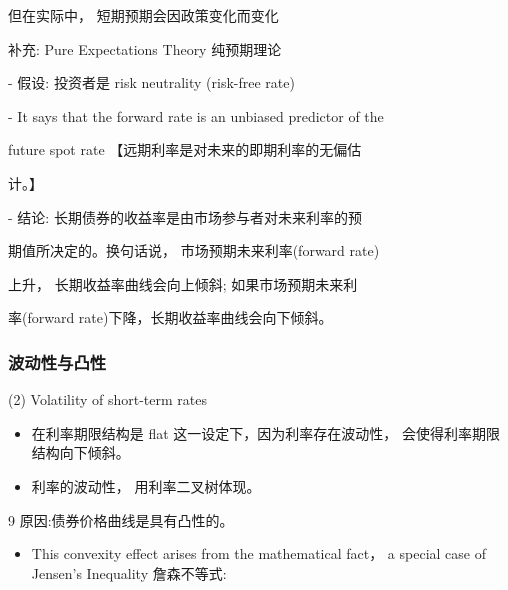但在实际中， 短期预期会因政策变化而变化


补充: Pure Expectations Theory 纯预期理论

\hspace*{1em} - 假设: 投资者是 risk neutrality (risk-free rate)

\hspace*{1em} - It says that the forward rate is an unbiased predictor of the

\hspace*{2em} future spot rate 【远期利率是对未来的即期利率的无偏估

\hspace*{2em} 计。】

\hspace*{1em} - 结论: 长期债券的收益率是由市场参与者对未来利率的预

\hspace*{2em} 期值所决定的。换句话说， 市场预期未来利率(forward rate)

\hspace*{2em} 上升， 长期收益率曲线会向上倾斜; 如果市场预期未来利

\hspace*{2em} 率(forward rate)下降，长期收益率曲线会向下倾斜。










\subsubsection{波动性与凸性}

(2) Volatility of short-term rates

\begin{itemize}
\item 在利率期限结构是 flat 这一设定下，因为利率存在波动性， 会使得利率期限结构向下倾斜。
\end{itemize}

\begin{itemize}
\item 利率的波动性， 用利率二叉树体现。
\end{itemize}

9 原因:债券价格曲线是具有凸性的。

\begin{itemize}
\item This convexity effect arises from the mathematical fact， a special case of Jensen's Inequality 詹森不等式:
\end{itemize}

